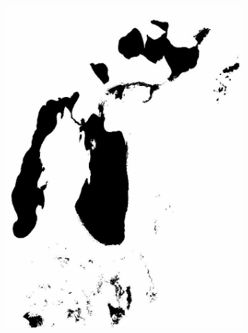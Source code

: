 \documentclass[12pt,a4paper]{article}
\begin{document}
\begin{figure}
\begin{subfigure}[b]{0.19\textwidth}
         \includegraphics[width=\textwidth]{../img/2006w.jpg}
         \caption{}
         \label{fig:}
     \end{subfigure}
     \begin{subfigure}[b]{0.19\textwidth}
         \centering

\end{subfigure}
\end{figure}
\end{document}
